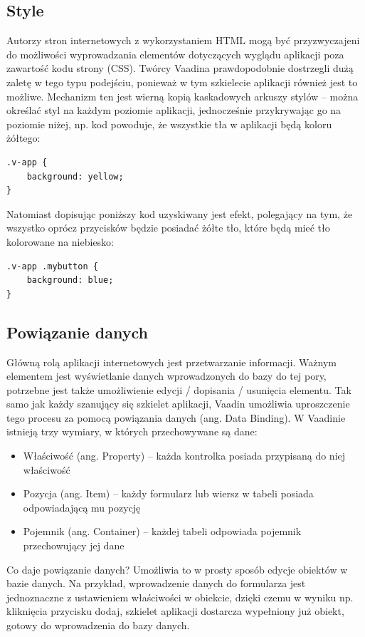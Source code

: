 \subsection{Style}
Autorzy stron internetowych z wykorzystaniem HTML mogą być przyzwyczajeni do możliwości wyprowadzania elementów dotyczących wyglądu aplikacji poza zawartość kodu strony (CSS). Twórcy Vaadina prawdopodobnie dostrzegli dużą zaletę w tego typu podejściu, ponieważ w tym szkielecie aplikacji również jest to możliwe. Mechanizm ten jest wierną kopią kaskadowych arkuszy stylów – można określać styl na każdym poziomie aplikacji, jednocześnie przykrywając go na poziomie niżej, np. kod powoduje, że wszystkie tła w aplikacji będą koloru żółtego:
\newpage
\begin{lstlisting}
.v-app {
	background: yellow;
}
\end{lstlisting}
Natomiast dopisując poniższy kod uzyskiwany jest efekt, polegający na tym, że wszystko oprócz przycisków będzie posiadać żółte tło, które będą mieć tło kolorowane na niebiesko:

\begin{lstlisting}
.v-app .mybutton {
	background: blue;
}
\end{lstlisting}
\subsection{Powiązanie danych}
Główną rolą aplikacji internetowych jest przetwarzanie informacji. Ważnym elementem jest wyświetlanie danych wprowadzonych do bazy do tej pory, potrzebne jest także umożliwienie edycji / dopisania / usunięcia elementu. Tak samo jak każdy szanujący się szkielet aplikacji, Vaadin umożliwia uproszczenie tego procesu za pomocą powiązania danych (ang. Data Binding). W Vaadinie istnieją trzy wymiary, w których przechowywane są dane:
\begin{itemize}
\item Właściwość (ang. Property) – każda kontrolka posiada przypisaną do niej właściwość
\item Pozycja (ang. Item) – każdy formularz lub wiersz w tabeli posiada odpowiadającą mu pozycję
\item Pojemnik (ang. Container) – każdej tabeli odpowiada pojemnik przechowujący jej dane
\end{itemize}

Co daje powiązanie danych? Umożliwia to w prosty sposób edycje obiektów w bazie danych. Na przykład, wprowadzenie danych do formularza jest jednoznaczne z ustawieniem właściwości w obiekcie, dzięki czemu w wyniku np. kliknięcia przycisku dodaj, szkielet aplikacji dostarcza wypełniony już obiekt, gotowy do wprowadzenia do bazy danych. 

